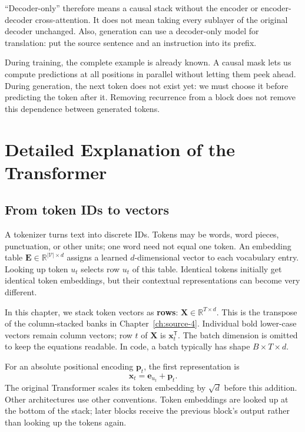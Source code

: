 \documentclass[11pt, oneside]{book}
\newcommand{\R}{\mathbb{R}}
\newcommand{\T}{^{\mathsf{T}}}           %
\let\originalsection\section
\renewcommand{\section}{\Needspace{7\baselineskip}\originalsection}
\let\originalsubsection\subsection
\renewcommand{\subsection}{\Needspace{6\baselineskip}\originalsubsection}
\begin{document}
``Decoder-only'' therefore means a causal stack without the encoder or encoder-decoder cross-attention. It does not mean taking every sublayer of the original decoder unchanged. Also, generation can use a decoder-only model for translation: put the source sentence and an instruction into its prefix.

\begin{intbox}[title={Parallel reading, sequential writing}]
During training, the complete example is already known. A causal mask lets us compute predictions at all positions in parallel without letting them peek ahead. During generation, the next token does not exist yet: we must choose it before predicting the token after it. Removing recurrence from a block does not remove this dependence between generated tokens.
\end{intbox}

\section{Detailed Explanation of the Transformer}\label{sec:source-5-2}
\subsection*{From token IDs to vectors}
A tokenizer turns text into discrete IDs. Tokens may be words, word pieces, punctuation, or other units; one word need not equal one token. An embedding table $\mathbf{E}\in\R^{|\mathcal{V}|\times d}$ assigns a learned $d$-dimensional vector to each vocabulary entry. Looking up token $u_t$ selects row $u_t$ of this table. Identical tokens initially get identical token embeddings, but their contextual representations can become very different.

In this chapter, we stack token vectors as \textbf{rows}: $\mathbf{X}\in\R^{T\times d}$. This is the transpose of the column-stacked banks in Chapter~\ref{ch:source-4}. Individual bold lower-case vectors remain column vectors; row $t$ of $\mathbf{X}$ is $\mathbf{x}_t\T$. The batch dimension is omitted to keep the equations readable. In code, a batch typically has shape $B\times T\times d$.

For an absolute positional encoding $\mathbf{p}_t$, the first representation is
\[
 \mathbf{x}_t=\mathbf{e}_{u_t}+\mathbf{p}_t.
\]
The original Transformer scales its token embedding by $\sqrt d$ before this addition. Other architectures use other conventions. Token embeddings are looked up at the bottom of the stack; later blocks receive the previous block's output rather than looking up the tokens again.
\end{document}
